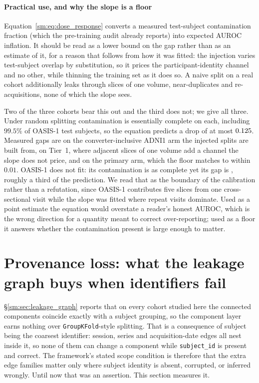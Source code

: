 \documentclass[11pt]{article}
\begin{document}
\paragraph{Practical use, and why the slope is a floor}
Equation~\ref{sm:eq:dose_response} converts a measured test-subject
contamination fraction
(which the pre-training audit already reports) into expected AUROC inflation. It should be read as a lower bound
on the gap rather than as an estimate of it, for a reason that follows
from how it was fitted: the injection varies test-subject overlap by
substitution, so it prices the participant-identity channel and no other,
while thinning the training set as it does so. A naive split on a real cohort additionally leaks
through slices of one volume, near-duplicates and re-acquisitions, none
of which the slope sees.

Two of the three cohorts bear this out and the third does not; we give all
three. Under random splitting contamination is essentially complete on each,
including $99.5\%$ of OASIS-1 test subjects, so the equation predicts a drop of
at most $0.125{}$. Measured gaps are \AdniConvGap{} on the
converter-inclusive ADNI1 arm the injected splits are built from,
\TierOneGapTotal{} on Tier~1, where adjacent slices of one volume add a channel
the slope does not price, and \AdniGapTotal{} on the primary arm, which the
floor matches to within $0.01$. OASIS-1 does not fit: its contamination is as
complete yet its gap is \OasisGapTotal{}, roughly a third of the prediction. We
read that as the boundary of the calibration rather than a refutation, since
OASIS-1 contributes five slices from one cross-sectional visit while the slope
was fitted where repeat visits dominate. Used as a point estimate the equation
would overstate a reader's honest AUROC, which is the wrong direction for a
quantity meant to correct over-reporting; used as a floor it answers whether
the contamination present is large enough to matter.




\section{Provenance loss: what the leakage graph buys when identifiers fail}
\label{sm:sec:provenance_degradation}

\S\ref{sm:sec:leakage_graph} reports that on every cohort studied here the
connected components coincide exactly with a subject grouping, so the
component layer earns nothing over \texttt{GroupKFold}-style splitting.
That is a consequence of subject being the coarsest identifier: session,
series and acquisition-date edges all nest inside it, so none of them can
change a component while \texttt{subject\_id} is present and correct. The
framework's stated scope condition is therefore that the extra edge
families matter only where subject identity is absent, corrupted, or
inferred wrongly. Until now that was an assertion. This section measures
it.
\end{document}
